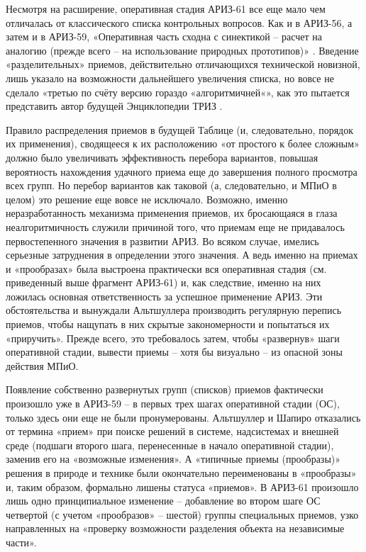 \documentclass[11pt,a4paper]{article}
\begin{document}
Несмотря на расширение, оперативная стадия АРИЗ-61 все еще мало чем отличалась
от классического списка контрольных вопросов. Как и в АРИЗ-56, а затем и в
АРИЗ-59, «Оперативная часть сходна с синектикой -- расчет на аналогию (прежде
всего -- на использование природных прототипов)» \cite{Altshuller1986a}.
Введение «разделительных» приемов, действительно отличающихся технической
новизной, лишь указало на возможности дальнейшего увеличения списка, но вовсе
не сделало «третью по счёту версию гораздо «алгоритмичней«», как это пытается
представить автор будущей Энциклопедии ТРИЗ \cite{Korolyev1998}.

Правило распределения приемов в будущей Таблице (и, следовательно, порядок их
применения), сводящееся к их расположению «от простого к более сложным» должно
было увеличивать эффективность перебора вариантов, повышая вероятность
нахождения удачного приема еще до завершения полного просмотра всех групп. Но
перебор вариантов как таковой (а, следовательно, и МПиО в целом) это решение
еще вовсе не исключало. Возможно, именно неразработанность механизма
применения приемов, их бросающаяся в глаза неалгоритмичность служили причиной
того, что приемам еще не придавалось первостепенного значения в развитии АРИЗ.
Во всяком случае, имелись серьезные затруднения в определении этого значения.
А ведь именно на приемах и «прообразах» была выстроена практически вся
оперативная стадия (см. приведенный выше фрагмент АРИЗ-61) и, как следствие,
именно на них ложилась основная ответственность за успешное применение АРИЗ.
Эти обстоятельства и вынуждали Альтшуллера производить регулярную перепись
приемов, чтобы нащупать в них скрытые закономерности и попытаться их
«приручить». Прежде всего, это требовалось затем, чтобы «развернув» шаги
оперативной стадии, вывести приемы -- хотя бы визуально -- из опасной зоны
действия МПиО.

Появление собственно развернутых групп (списков) приемов фактически произошло
уже в АРИЗ-59 -- в первых трех шагах оперативной стадии (ОС), только здесь они
еще не были пронумерованы. Альтшуллер и Шапиро отказались от термина «прием»
при поиске решений в системе, надсистемах и внешней среде (подшаги второго
шага, перенесенные в начало оперативной стадии), заменив его на «возможные
изменения». А «типичные приемы (прообразы)» решения в природе и технике были
окончательно переименованы в «прообразы» и, таким образом, формально лишены
статуса «приемов». В АРИЗ-61 произошло лишь одно принципиальное изменение --
добавление во втором шаге ОС четвертой (с учетом «прообразов» -- шестой)
группы специальных приемов, узко направленных на «проверку возможности
разделения объекта на независимые части».
\end{document}
